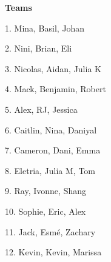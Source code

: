 \documentclass[12pt,letterpaper,noanswers]{exam}
\begin{document}
\noindent \textbf{Teams}
\begin{multicols}{3}
1. Mina, Basil, Johan

2. Nini, Brian, Eli

3. Nicolas, Aidan, Julia K

4. Mack, Benjamin, Robert

5. Alex, RJ, Jessica

6. Caitlin, Nina, Daniyal

7. Cameron, Dani, Emma

8. Eletria, Julia M, Tom

9. Ray, Ivonne, Shang

10.  Sophie, Eric, Alex

11. Jack, Esmé, Zachary

12. Kevin, Kevin, Marissa

\end{multicols}
\end{document}
